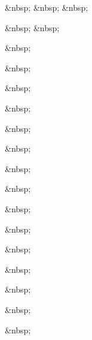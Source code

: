 \&nbsp;
\&nbsp;
\&nbsp;

\&nbsp;
\&nbsp;



\&nbsp;

\&nbsp;

\&nbsp;

\&nbsp;

\&nbsp;

\&nbsp;

\&nbsp;

\&nbsp;

\&nbsp;





\&nbsp;

\&nbsp;

\&nbsp;

\&nbsp;

\&nbsp;

\&nbsp;

